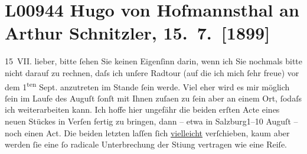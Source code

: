 

\section[Hugo von Hofmannsthal an Arthur Schnitzler, 15. 7. {[}1899{]}]{L00944 Hugo von Hofmannsthal an Arthur Schnitzler, 15. 7. {[}1899{]}}
\nopagebreak{}
\rehead{ }\normalsize\beginnumbering{}
\toendnotes[C]{\smallbreak\pagebreak[2]}
\toendnotes[C]{\smallbreak}
\pstart
           \raggedleft{}{\pb}15 VII.\pend
           \vspace{0.5em}
\pstart
           lieber, bitte ſehen Sie keinen Eigenſinn darin, wenn ich Sie
               nochmals bitte nicht darauf zu rechnen, daſs ich unſere Radtour \introOben{}(auf die ich mich ſehr freue)\introOben{} vor dem 1\textsuperscript{ten}{ }Sept. anzutreten im Stande ſein werde.
               Viel eher wird es mir möglich ſein im Laufe des Auguſt{ }ſonſt mit Ihnen zuſa{\geminationm}en zu ſein aber {\pb}an einem Ort,
               ſodaſs ich weiterarbeiten kann. Ich hoffe hier ungefähr die beiden erſten Acte eines
               neuen Stückes in Verſen fertig
               zu bringen, dann – etwa in Salzburg1–10 Auguſt – noch einen Act. Die beiden letzten laſſen ſich \uline{vielleicht} verſchieben, kaum aber {\pb}werden ſie eine ſo radicale
               Unterbrechung der Sti{\geminationm}ung vertragen wie eine Reiſe.\pend
           
